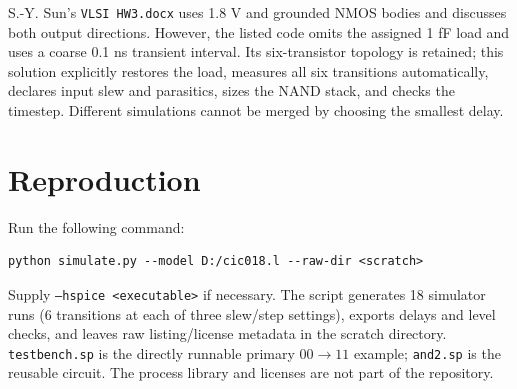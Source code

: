 \documentclass[11pt]{article}
\begin{document}
S.-Y. Sun's \texttt{VLSI HW3.docx} uses 1.8 V and grounded NMOS bodies and discusses both output directions. However, the listed code omits the assigned 1 fF load and uses a coarse 0.1 ns transient interval. Its six-transistor topology is retained; this solution explicitly restores the load, measures all six transitions automatically, declares input slew and parasitics, sizes the NAND stack, and checks the timestep. Different simulations cannot be merged by choosing the smallest delay.

\section*{Reproduction}
Run the following command:
\begin{lstlisting}
python simulate.py --model D:/cic018.l --raw-dir <scratch>
\end{lstlisting}
Supply \texttt{--hspice <executable>} if necessary. The script generates 18 simulator runs (6 transitions at each of three slew/step settings), exports delays and level checks, and leaves raw listing/license metadata in the scratch directory. \texttt{testbench.sp} is the directly runnable primary $00\to11$ example; \texttt{and2.sp} is the reusable circuit. The process library and licenses are not part of the repository.
\end{document}
